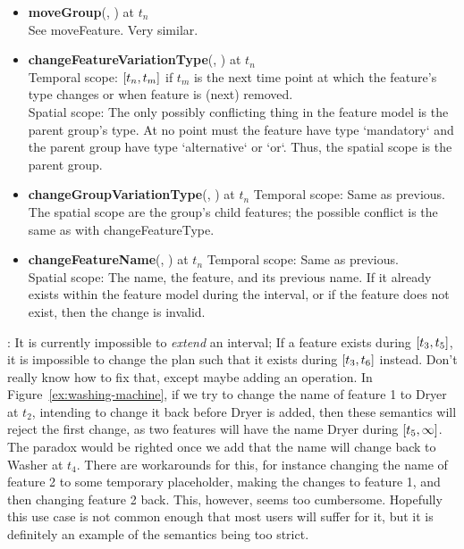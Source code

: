\begin{itemize}
  \item \textbf{moveGroup}(, ) at $t_n$\\
    See moveFeature. Very similar.
  \item \textbf{changeFeatureVariationType}(, ) at $t_n$\\
    Temporal scope: $\interval{t_n}{t_m}$ if $t_m$ is the next time point at which the feature's type changes or when feature is (next) removed.\\
    Spatial scope: The only possibly conflicting thing in the feature model is the parent group's type. At no point must the feature have type `mandatory` and the parent group have type `alternative` or `or`. Thus, the spatial scope is the parent group.\\
  \item \textbf{changeGroupVariationType}(, ) at $t_n$
    Temporal scope: Same as previous.\\
    The spatial scope are the group's child features; the possible conflict is the same as with changeFeatureType.\\
  \item \textbf{changeFeatureName}(, ) at $t_n$
    Temporal scope: Same as previous.\\
    Spatial scope: The name, the feature, and its previous name. If it already exists within the feature model during the interval, or if the feature does not exist, then the change is invalid. 
\end{itemize}

: It is currently impossible to \emph{extend} an interval; If a feature exists during $\interval{t_3}{t_5}$, it is impossible to change the plan such that it exists during $\interval{t_3}{t_6}$ instead. Don't really know how to fix that, except maybe adding an operation. In Figure~\vref{ex:washing-machine}, if we try to change the name of feature 1 to Dryer at $t_2$, intending to change it back before Dryer is added, then these semantics will reject the first change, as two features will have the name Dryer during $\interval{t_5}{\forever}$. The paradox would be righted once we add that the name will change back to Washer at $t_4$. There are workarounds for this, for instance changing the name of feature 2 to some temporary placeholder, making the changes to feature 1, and then changing feature 2 back. This, however, seems too cumbersome. Hopefully this use case is not common enough that most users will suffer for it, but it is definitely an example of the semantics being too strict. 
